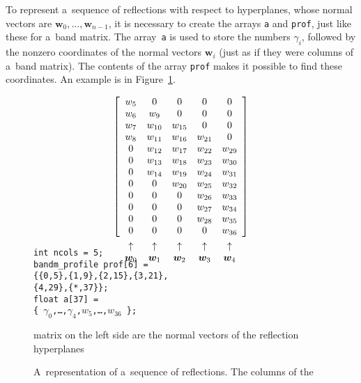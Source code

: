 To represent a~sequence of reflections with respect to hyperplanes, whose
normal vectors are $\bm{w}_0,\ldots,\bm{w}_{n-1}$, it is necessary to
create the arrays \texttt{a} and \texttt{prof}, just like these for a~band
matrix. The array~\texttt{a} is used to store the numbers $\gamma_i$, followed by
the nonzero coordinates of the normal vectors $\bm{w}_i$ (just as if they
were columns of a~band matrix). The contents of the array \texttt{prof}
makes it possible to find these coordinates. An example is in
Figure~\ref{fig:householder:matrix}.%
\begin{figure}[ht]
\newcommand{\mkb}[2]{\mbox{\raisebox{0pt}[0pt][0pt]{$\displaystyle%
\begin{array}[t]{@{}c@{}}{#1} \\[4pt] \uparrow \\ {#2} \end{array}$}}}
  \begin{minipage}{2.2in}
  \begin{align*}
    \left[\begin{array}{ccccc}
      w_5 &   0    &      0 &      0 &   0    \\
      w_6 & w_9    &      0 &      0 &   0    \\
      w_7 & w_{10} & w_{15} &      0 &   0    \\
      w_8 & w_{11} & w_{16} & w_{21} &   0    \\
        0 & w_{12} & w_{17} & w_{22} & w_{29} \\
        0 & w_{13} & w_{18} & w_{23} & w_{30} \\
        0 & w_{14} & w_{19} & w_{24} & w_{31} \\
        0 &   0    & w_{20} & w_{25} & w_{32} \\
        0 &   0    &      0 & w_{26} & w_{33} \\
        0 &   0    &      0 & w_{27} & w_{34} \\
        0 &   0    &      0 & w_{28} & w_{35} \\
        \mkb{0}{\bm{w}_0} & \mkb{0}{\bm{w}_1} &
        \mkb{0}{\bm{w}_2} & \mkb{0}{\bm{w}_3} &
        \mkb{w_{36}}{\bm{w}_4}
    \end{array}\right]
  \end{align*}
  \vspace*{0.6cm}
  \end{minipage}
  \begin{minipage}{2.75in}
    \texttt{int ncols = 5;} \\[10pt]
    \texttt{bandm\_profile prof[6] = \\
     \{\{0,5\},\{1,9\},\{2,15\},\{3,21\},\\
     \{4,29\},\{*,37\}\};} \\[10pt]
    \texttt{float a[37] = \\
    \{ $\gamma_0$,\ldots,$\gamma_4$,$w_5$,\ldots,$w_{36}$ \};}
  \end{minipage}
  \caption{\label{fig:householder:matrix}A~representation of a~sequence of
    reflections. The columns of the}
  \centerline{matrix on the left side are the normal vectors
   of the reflection hyperplanes}
\end{figure}

